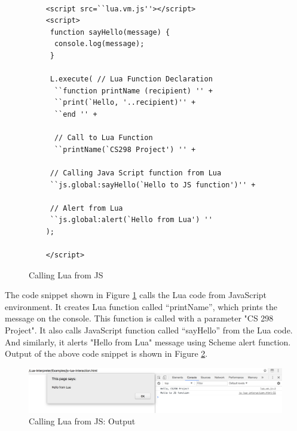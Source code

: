 \begin{figure}[H]
	\begin{lstlisting}[frame=single, style=base]

	<script src=``lua.vm.js''></script>
	<script>
	 function sayHello(message) {
	  console.log(message);
	 }
	
	 L.execute( // Lua Function Declaration
	  ``function printName (recipient) '' +
	  ``print(`Hello, '..recipient)'' +
	  ``end '' +
	
	  // Call to Lua Function
	  ``printName(`CS298 Project') '' +
	
	 // Calling Java Script function from Lua 
	 ``js.global:sayHello(`Hello to JS function')'' +
	
	 // Alert from Lua 
	 ``js.global:alert(`Hello from Lua') ''
	); 

	</script>
	\end{lstlisting}
	\caption{Calling Lua from JS}
	\label{fig:callingluafromjs}
\end{figure}


The code snippet shown in Figure \ref{fig:callingluafromjs} calls the Lua code from JavaScript environment. It creates Lua function called ``printName'', which prints the message on the console. This function is called with a parameter "CS 298 Project". It also calls JavaScript function called ``sayHello'' from the Lua code. And similarly, it alerts "Hello from Lua" message using Scheme alert function. Output of the above code snippet is shown in Figure \ref{fig:js-to-lua-interaction}.

\begin{figure}[H]
	\begin{center}
		\includegraphics[width=\linewidth]{./images/js-to-lua-interaction.png}
	\end{center}
	\caption{Calling Lua from JS: Output}
	\label{fig:js-to-lua-interaction}
\end{figure}


